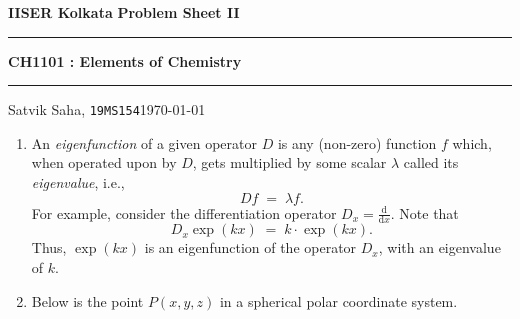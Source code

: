 \documentclass[10pt]{article}
\begin{document}
        \par\textbf{IISER Kolkata} \hfill \textbf{Problem Sheet II}
        \vspace{3pt}
        \hrule
        \vspace{3pt}
        \begin{center}
                \LARGE{\textbf{CH1101 : Elements of Chemistry}}
        \end{center}
        \vspace{3pt}
        \hrule
        \vspace{3pt}
        Satvik Saha, \texttt{19MS154}\hfill\today
        \vspace{20pt}

        \begin{enumerate}
                \item An \textit{eigenfunction} of a given operator $D$ is any (non-zero) function $f$ which, when operated upon by $D$,
                        gets multiplied by some scalar $\lambda$ called its \textit{eigenvalue}, i.e.,
                        \[
                                Df \;=\; \lambda f.
                        \]
                        For example, consider the differentiation operator $D_x = \frac{\mathrm{d} }{\mathrm{d}x}$. Note that
                        \[
                                D_x \exp(kx) \;=\; k \cdot\exp(kx).
                        \]
                        Thus, $\exp(kx)$ is an eigenfunction of the operator $D_x$, with an eigenvalue of $k$.
                
                \item Below is the point $P(x, y, z)$ in a spherical polar coordinate system.
                        \begin{center}
\end{center}
\end{enumerate}
\end{document}
